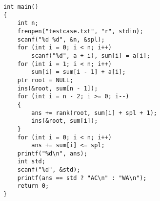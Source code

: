 \documentclass{article}
\begin{document}
\begin{lstlisting}
int main()
{
    int n;
    freopen("testcase.txt", "r", stdin);
    scanf("%d %d", &n, &spl);
    for (int i = 0; i < n; i++)
        scanf("%d", a + i), sum[i] = a[i];
    for (int i = 1; i < n; i++)
        sum[i] = sum[i - 1] + a[i];
    ptr root = NULL;
    ins(&root, sum[n - 1]);
    for (int i = n - 2; i >= 0; i--)
    {
        ans += rank(root, sum[i] + spl + 1);
        ins(&root, sum[i]);
    }
    for (int i = 0; i < n; i++)
        ans += sum[i] <= spl;
    printf("%d\n", ans);
    int std;
    scanf("%d", &std);
    printf(ans == std ? "AC\n" : "WA\n");
    return 0;
}
\end{lstlisting}
\end{document}

